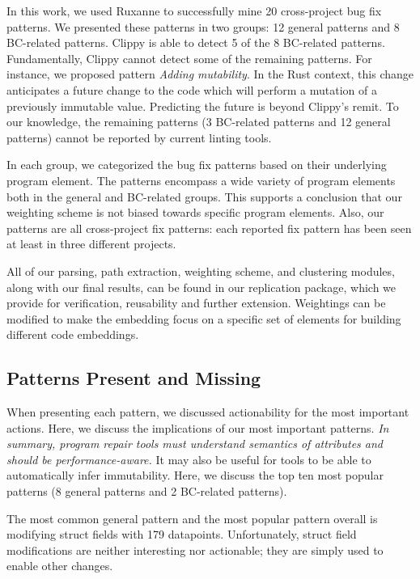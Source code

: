 In this work, we used Ruxanne to successfully mine 20 cross-project bug fix patterns. We presented these patterns in two groups: 12 general patterns and 8 BC-related patterns. Clippy is able to detect 5 of the 8 BC-related patterns. Fundamentally, Clippy cannot detect some of the remaining patterns. For instance, we proposed pattern \textit{Adding mutability}. In the Rust context, this change anticipates a future change to the code which will perform a mutation of a previously immutable value. Predicting the future is beyond Clippy's remit. To our knowledge, the remaining patterns (3 BC-related patterns and 12 general patterns) cannot be reported by current linting tools. 

In each group, we categorized the bug fix patterns based on their underlying program element. The patterns encompass a wide variety of program elements both in the general and BC-related groups. This supports a conclusion that our weighting scheme is not biased towards specific program elements. Also, our patterns are all cross-project fix patterns: each reported fix pattern has been seen at least in three different projects.

All of our parsing, path extraction, weighting scheme, and clustering modules, along with our final results, can be found in our replication package, which we provide for verification, reusability and further extension. Weightings can be modified to make the embedding focus on a specific set of elements for building different code embeddings.

\subsection{Patterns Present and Missing}
\label{subsec:patterns}

When presenting each pattern, we discussed actionability for the most important actions. Here, we discuss the implications of our most important patterns. \emph{In summary, program repair tools must understand semantics of attributes and should be performance-aware.} It may also be useful for tools to be able to automatically infer immutability. Here, we discuss the top ten most popular patterns (8 general patterns and 2 BC-related patterns).

The most common general pattern and the most popular pattern overall is modifying struct fields with 179 datapoints. Unfortunately, struct field modifications are neither interesting nor actionable; they are simply used to enable other changes. 

